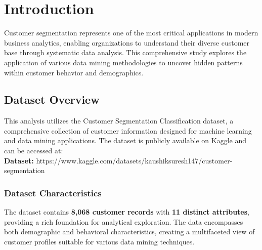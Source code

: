 \documentclass[12pt,a4paper]{article}
\begin{document}
\begin{titlepage}
    \vspace{0.5cm}
\end{titlepage}

\pagestyle{reportstyle}

\newpage

\renewcommand{\contentsname}{Table of Contents}
\setcounter{tocdepth}{3}
\makeatletter
\renewcommand{\l@section}{\@dottedtocline{1}{0em}{1.5em}}
\renewcommand{\l@subsection}{\@dottedtocline{2}{1.5em}{2.3em}}
\renewcommand{\l@subsubsection}{\@dottedtocline{3}{3em}{3.2em}}
\makeatother

\tableofcontents
\newpage

\section{Introduction}

Customer segmentation represents one of the most critical applications in modern business analytics, enabling organizations to understand their diverse customer base through systematic data analysis. This comprehensive study explores the application of various data mining methodologies to uncover hidden patterns within customer behavior and demographics.

\subsection{Dataset Overview}

This analysis utilizes the Customer Segmentation Classification dataset, a comprehensive collection of customer information designed for machine learning and data mining applications. The dataset is publicly available on Kaggle and can be accessed at:\\

\textbf{Dataset:} https://www.kaggle.com/datasets/kaushiksuresh147/customer-segmentation

\subsubsection{Dataset Characteristics}

The dataset contains \textbf{8,068 customer records} with \textbf{11 distinct attributes}, providing a rich foundation for analytical exploration. The data encompasses both demographic and behavioral characteristics, creating a multifaceted view of customer profiles suitable for various data mining techniques.
\end{document}
